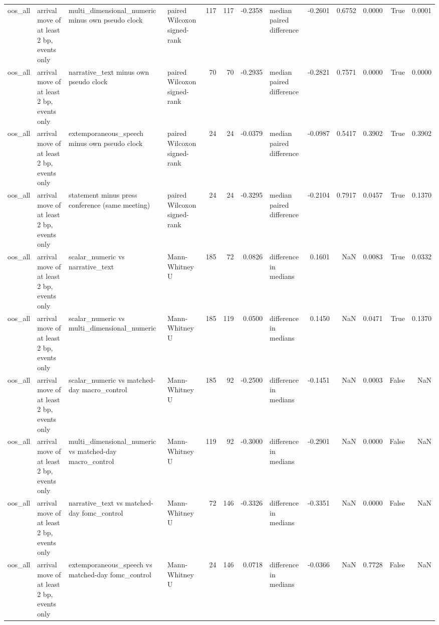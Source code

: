 \begin{tabular}{llllrrrlrrrrr}
oos_all & arrival move of at least 2 bp, events only & multi_dimensional_numeric minus own pseudo clock & paired Wilcoxon signed-rank & 117 & 117 & -0.2358 & median paired difference & -0.2601 & 0.6752 & 0.0000 & True & 0.0001 \\
oos_all & arrival move of at least 2 bp, events only & narrative_text minus own pseudo clock & paired Wilcoxon signed-rank & 70 & 70 & -0.2935 & median paired difference & -0.2821 & 0.7571 & 0.0000 & True & 0.0000 \\
oos_all & arrival move of at least 2 bp, events only & extemporaneous_speech minus own pseudo clock & paired Wilcoxon signed-rank & 24 & 24 & -0.0379 & median paired difference & -0.0987 & 0.5417 & 0.3902 & True & 0.3902 \\
oos_all & arrival move of at least 2 bp, events only & statement minus press conference (same meeting) & paired Wilcoxon signed-rank & 24 & 24 & -0.3295 & median paired difference & -0.2104 & 0.7917 & 0.0457 & True & 0.1370 \\
oos_all & arrival move of at least 2 bp, events only & scalar_numeric vs narrative_text & Mann-Whitney U & 185 & 72 & 0.0826 & difference in medians & 0.1601 & NaN & 0.0083 & True & 0.0332 \\
oos_all & arrival move of at least 2 bp, events only & scalar_numeric vs multi_dimensional_numeric & Mann-Whitney U & 185 & 119 & 0.0500 & difference in medians & 0.1450 & NaN & 0.0471 & True & 0.1370 \\
oos_all & arrival move of at least 2 bp, events only & scalar_numeric vs matched-day macro_control & Mann-Whitney U & 185 & 92 & -0.2500 & difference in medians & -0.1451 & NaN & 0.0003 & False & NaN \\
oos_all & arrival move of at least 2 bp, events only & multi_dimensional_numeric vs matched-day macro_control & Mann-Whitney U & 119 & 92 & -0.3000 & difference in medians & -0.2901 & NaN & 0.0000 & False & NaN \\
oos_all & arrival move of at least 2 bp, events only & narrative_text vs matched-day fomc_control & Mann-Whitney U & 72 & 146 & -0.3326 & difference in medians & -0.3351 & NaN & 0.0000 & False & NaN \\
oos_all & arrival move of at least 2 bp, events only & extemporaneous_speech vs matched-day fomc_control & Mann-Whitney U & 24 & 146 & 0.0718 & difference in medians & -0.0366 & NaN & 0.7728 & False & NaN \\
\bottomrule
\end{tabular}
